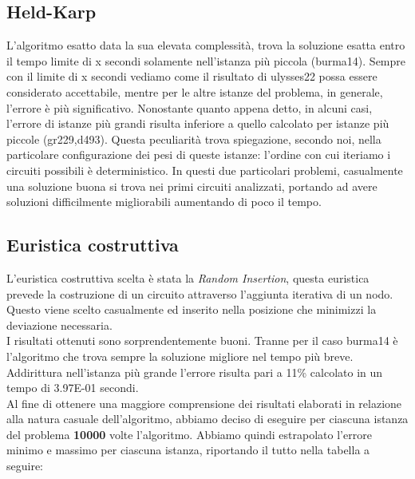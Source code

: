 \documentclass{article}
\begin{document}
\subsection*{Held-Karp}
L'algoritmo esatto data la sua elevata complessità, trova la soluzione esatta entro il tempo limite di x secondi solamente nell'istanza più piccola (burma14). Sempre con il limite di x secondi vediamo come il risultato di ulysses22 possa essere considerato accettabile, mentre per le altre istanze del problema, in generale, l'errore è più significativo. Nonostante quanto appena detto, in alcuni casi, l'errore di istanze più grandi risulta inferiore a quello calcolato per istanze più piccole (gr229,d493). Questa peculiarità trova spiegazione, secondo noi, nella particolare configurazione dei pesi di queste istanze: l'ordine con cui iteriamo i circuiti possibili è deterministico. In questi due particolari problemi, casualmente una soluzione buona si trova nei primi circuiti analizzati, portando ad avere soluzioni difficilmente migliorabili aumentando di poco il tempo.

\subsection*{Euristica costruttiva}
L'euristica costruttiva scelta è stata la \textit{Random Insertion}, questa euristica prevede la costruzione di un circuito attraverso l'aggiunta iterativa di un nodo. 
Questo viene scelto casualmente ed inserito nella posizione che minimizzi la deviazione necessaria.\\
I risultati ottenuti sono sorprendentemente buoni. Tranne per il caso burma14 è l'algoritmo che trova sempre la soluzione migliore nel tempo più breve. Addirittura nell'istanza più grande l'errore risulta pari a 11\% calcolato in un tempo di 3.97E-01 secondi.\\
Al fine di ottenere una maggiore comprensione dei risultati elaborati in relazione alla natura casuale dell'algoritmo, abbiamo deciso di eseguire per ciascuna istanza del problema \textbf{10000} volte l'algoritmo. Abbiamo quindi estrapolato l'errore minimo e massimo per ciascuna istanza, riportando il tutto nella tabella a seguire:\\ 
\end{document}
